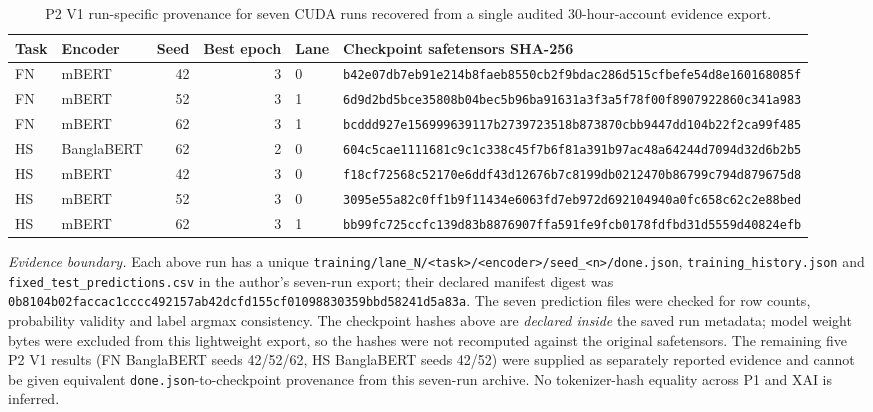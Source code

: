 \begin{table}[p]
\centering
\caption{P2 V1 run-specific provenance for seven CUDA runs recovered
from a single audited 30-hour-account evidence export.}
\label{tab:p2runmanifest}
\scriptsize
\begin{adjustbox}{max width=\linewidth}
\begin{tabular}{llrrll}
\toprule
Task & Encoder & Seed & Best epoch & Lane & Checkpoint safetensors SHA-256 \\
\midrule
FN & mBERT & 42 & 3 & 0 & \texttt{b42e07db7eb91e214b8faeb8550cb2f9bdac286d515cfbefe54d8e160168085f} \\
FN & mBERT & 52 & 3 & 1 & \texttt{6d9d2bd5bce35808b04bec5b96ba91631a3f3a5f78f00f8907922860c341a983} \\
FN & mBERT & 62 & 3 & 1 & \texttt{bcddd927e156999639117b2739723518b873870cbb9447dd104b22f2ca99f485} \\
HS & BanglaBERT & 62 & 2 & 0 & \texttt{604c5cae1111681c9c1c338c45f7b6f81a391b97ac48a64244d7094d32d6b2b5} \\
HS & mBERT & 42 & 3 & 0 & \texttt{f18cf72568c52170e6ddf43d12676b7c8199db0212470b86799c794d879675d8} \\
HS & mBERT & 52 & 3 & 0 & \texttt{3095e55a82c0ff1b9f11434e6063fd7eb972d692104940a0fc658c62c2e88bed} \\
HS & mBERT & 62 & 3 & 1 & \texttt{bb99fc725ccfc139d83b8876907ffa591fe9fcb0178fdfbd31d5559d40824efb} \\
\bottomrule
\end{tabular}
\end{adjustbox}

\par\smallskip
\begin{minipage}{0.98\linewidth}\scriptsize
\emph{Evidence boundary.} Each above run has a unique
\texttt{training/lane\_N/<task>/<encoder>/seed\_<n>/done.json},
\texttt{training\_history.json} and \texttt{fixed\_test\_predictions.csv}
in the author's seven-run export; their declared manifest digest was
\texttt{0b8104b02faccac1cccc492157ab42dcfd155cf01098830359bbd58241d5a83a}.
The seven prediction files were checked for row counts, probability
validity and label argmax consistency. The checkpoint hashes above are
\emph{declared inside} the saved run metadata; model weight bytes were
excluded from this lightweight export, so the hashes were not recomputed
against the original safetensors. The remaining five P2 V1 results
(FN BanglaBERT seeds 42/52/62, HS BanglaBERT seeds 42/52) were supplied
as separately reported evidence and cannot be given equivalent
\texttt{done.json}-to-checkpoint provenance from this seven-run archive.
No tokenizer-hash equality across P1 and XAI is inferred.
\end{minipage}
\end{table}
